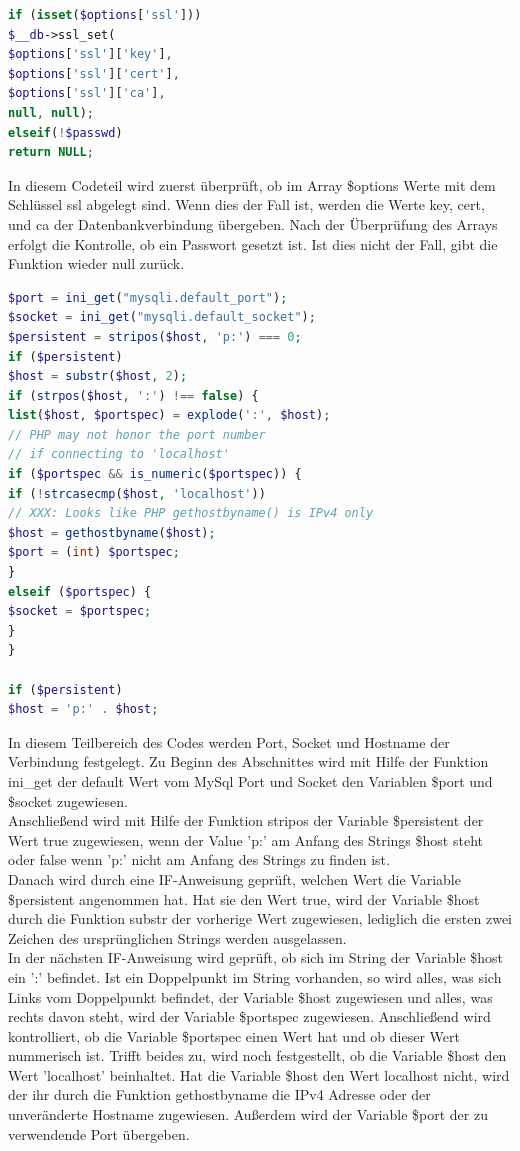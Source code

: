 \newpage

\begin{lstlisting}[language=PHP, caption=mysqli.php/function-db\_connect2, firstnumber=32]
if (isset($options['ssl']))
$__db->ssl_set(
$options['ssl']['key'],
$options['ssl']['cert'],
$options['ssl']['ca'],
null, null);
elseif(!$passwd)
return NULL;
\end{lstlisting}
In diesem Codeteil wird zuerst überprüft, ob im Array \$options Werte mit dem Schlüssel ssl abgelegt sind. Wenn dies der Fall ist, werden die Werte key, cert, und ca der Datenbankverbindung übergeben. Nach der Überprüfung des Arrays erfolgt die Kontrolle, ob ein Passwort gesetzt ist. Ist dies nicht der Fall, gibt die Funktion wieder null zurück.

\newpage

\begin{lstlisting}[language=PHP, caption=mysqli.php/function-db\_connect3, firstnumber=41]
$port = ini_get("mysqli.default_port");
$socket = ini_get("mysqli.default_socket");
$persistent = stripos($host, 'p:') === 0;
if ($persistent)
$host = substr($host, 2);
if (strpos($host, ':') !== false) {
list($host, $portspec) = explode(':', $host);
// PHP may not honor the port number 
// if connecting to 'localhost'
if ($portspec && is_numeric($portspec)) {
if (!strcasecmp($host, 'localhost'))
// XXX: Looks like PHP gethostbyname() is IPv4 only
$host = gethostbyname($host);
$port = (int) $portspec;
}
elseif ($portspec) {
$socket = $portspec;
}
}

if ($persistent)
$host = 'p:' . $host;
\end{lstlisting}

In diesem Teilbereich des Codes werden Port, Socket und Hostname der Verbindung festgelegt. Zu Beginn des Abschnittes wird mit Hilfe der Funktion ini\_get der default Wert vom MySql Port und Socket den Variablen \$port und \$socket zugewiesen.\\
Anschließend wird mit Hilfe der Funktion stripos der Variable \$persistent der Wert true zugewiesen, wenn der Value 'p:' am Anfang des Strings \$host steht oder false wenn 'p:' nicht am Anfang des Strings zu finden ist.\\
Danach wird durch eine IF-Anweisung geprüft, welchen Wert die Variable \$persistent angenommen hat. Hat sie den Wert true, wird der Variable \$host durch die Funktion substr der vorherige Wert zugewiesen, lediglich die ersten zwei Zeichen des ursprünglichen Strings werden ausgelassen. \\
In der nächsten IF-Anweisung wird geprüft, ob sich im String der Variable \$host ein ':' befindet. Ist ein Doppelpunkt im String vorhanden, so wird alles, was sich Links vom Doppelpunkt befindet, der Variable \$host zugewiesen und alles, was rechts davon steht, wird der Variable \$portspec zugewiesen. Anschließend wird kontrolliert, ob die Variable \$portspec einen Wert hat und ob dieser Wert nummerisch ist. Trifft beides zu, wird noch festgestellt, ob die Variable \$host den Wert 'localhost' beinhaltet. Hat die Variable \$host den Wert localhost nicht, wird der ihr durch die Funktion gethostbyname die IPv4 Adresse oder der unveränderte Hostname zugewiesen. Außerdem wird der Variable \$port der zu verwendende Port übergeben.

